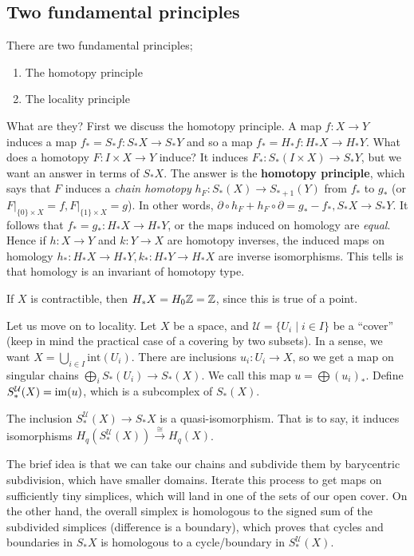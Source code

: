 \subsection{Two fundamental principles}
There are two fundamental principles;
\begin{enumerate}[label=(\arabic*)]
\setlength\itemsep{-.2em}
    \item The homotopy principle
    \item The locality principle
\end{enumerate}
What are they? First we discuss the homotopy principle. A map $f \colon X \to Y$ induces a map $f_* =S_*f\colon S_*X \to S_*Y$ and so a map $f_*=H_*f \colon H_*X \to H_* Y$. What does a homotopy $F \colon I \times X \to Y$ induce? It induces $F_* \colon S_*(I \times X) \to S_*Y$, but we want an answer in terms of $S_*X$. The answer is the \textbf{homotopy principle}, which says that $F$ induces a \emph{chain homotopy} $h_F \colon S_*(X) \to S_{*+1}(Y)$ from $f_* $ to $g_*$ (or $\left. F \right| _{\{0\} \times X}=f, \left. F \right| _{\{1\} \times X}=g$). In other words, $\partial \circ h_F +h_F \circ \partial =g_* - f_*, S_*X \to S_*Y$. It follows that $f_* = g_* \colon H_*X \to H_*Y$, or the maps induced on homology are \emph{equal}. Hence if $h \colon X \to Y$ and $k \colon Y \to X$ are homotopy inverses, the induced maps on homology $h_* \colon H_*X \to H_*Y, k_* \colon H_*Y \to H_*X$ are inverse isomorphisms. This tells is that homology is an invariant of homotopy type.
        \begin{example}
            If $X$ is contractible, then $H_*X=H_0 \mathbb{Z}=\mathbb{Z}$, since this is true of a point.
        \end{example}
        Let us move on to locality. Let $X$ be a space, and $\mathcal{U} = \{U_i  \mid i \in I\} $ be a ``cover'' (keep in mind the practical case of a covering by two subsets). In a sense, we want $X= \bigcup_{i \in  I} \mathrm{int}(U_i )$. There are inclusions $u_i  \colon U_i  \to X$, so we get a map on singular chains $\bigoplus _i  S_*(U_i ) \to S_*(X)$. We call this map $u=\bigoplus(u_i )_*$. Define $S_*^{\mathcal{U} }(X)=\operatorname{im} (u)$, which is a subcomplex of $S_*(X)$.
        \begin{theorem}[Locality]
            The inclusion $S_*^{\mathcal{U} }(X) \to S_*X$ is a quasi-isomorphism. That is to say, it induces isomorphisms $H_q(S_*^{\mathcal{U} }(X))\xrightarrow{\cong} H_q(X)$.
        \end{theorem}
        The brief idea is that we can take our chains and subdivide them by barycentric subdivision, which have smaller domains. Iterate this process to get maps on sufficiently tiny simplices, which will land in one of the sets of our open cover. On the other hand, the overall simplex is homologous to the signed sum of the subdivided simplices (difference is a boundary), which proves that cycles and boundaries in $S_*X$ is homologous to a cycle/boundary in $S_*^{ \mathcal{U} }(X)$.

